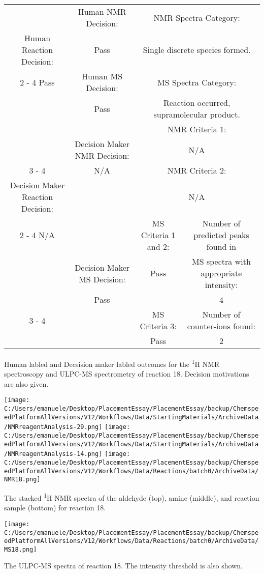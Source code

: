 \documentclass{article}%
\begin{document}
\begin{Decision Table}[H]%
\begin{tabular}{|c|c|c|c|}%
\hline%
&Human NMR Decision:&\multicolumn{2}{|c|}{NMR Spectra Category:}\\%
Human Reaction Decision:&Pass&\multicolumn{2}{|c|}{Single discrete species formed.}\\%
\cline{2%
-%
4}%
Pass&Human MS Decision:&\multicolumn{2}{|c|}{MS Spectra Category:}\\%
&Pass&\multicolumn{2}{|c|}{Reaction occurred, supramolecular product.}\\%
\hline%
&&\multicolumn{2}{|c|}{NMR Criteria 1:}\\%
&Decision Maker NMR Decision:&\multicolumn{2}{|c|}{N/A}\\%
\cline{3%
-%
4}%
&N/A&\multicolumn{2}{|c|}{NMR Criteria 2:}\\%
Decision Maker Reaction Decision:&&\multicolumn{2}{|c|}{N/A}\\%
\cline{2%
-%
4}%
N/A&&MS Criteria 1 and 2:&Number of predicted peaks found in\\%
&Decision Maker MS Decision:&Pass&MS spectra with appropriate intensity:\\%
&Pass&&4\\%
\cline{3%
-%
4}%
&&MS Criteria 3:&Number of counter{-}ions found:\\%
&&Pass&2\\%
\hline%
\end{tabular}%
\caption{Human labled and Decsision maker labled outcomes for the \textsuperscript{1}H NMR spectroscopy and ULPC-MS spectrometry of reaction 18. Decision motivations are also given.}%
\end{Decision Table}%
\begin{NMR Spectra}[H]%
\begin{center}%
\texttt{[image: C:/Users/emanuele/Desktop/PlacementEssay/PlacementEssay/backup/ChemspeedPlatformAllVersions/V12/Workflows/Data/StartingMaterials/ArchiveData/NMRreagentAnalysis-29.png]}\hfill%
\texttt{[image: C:/Users/emanuele/Desktop/PlacementEssay/PlacementEssay/backup/ChemspeedPlatformAllVersions/V12/Workflows/Data/StartingMaterials/ArchiveData/NMRreagentAnalysis-14.png]}\hfill%
\texttt{[image: C:/Users/emanuele/Desktop/PlacementEssay/PlacementEssay/backup/ChemspeedPlatformAllVersions/V12/Workflows/Data/Reactions/batch0/ArchiveData/NMR18.png]}\hfill%
\end{center}%
\caption{The stacked \textsuperscript{1}H NMR spectra of the aldehyde (top), amine (middle), and reaction sample (bottom) for reaction 18.}%
\end{NMR Spectra}%
\begin{MS Spectra}[H]%
\begin{center}%
\texttt{[image: C:/Users/emanuele/Desktop/PlacementEssay/PlacementEssay/backup/ChemspeedPlatformAllVersions/V12/Workflows/Data/Reactions/batch0/ArchiveData/MS18.png]}\hfill%
\end{center}%
\caption{The ULPC-MS spectra of reaction 18. The intensity threshold is also shown.}%
\end{MS Spectra}%
\end{document}
